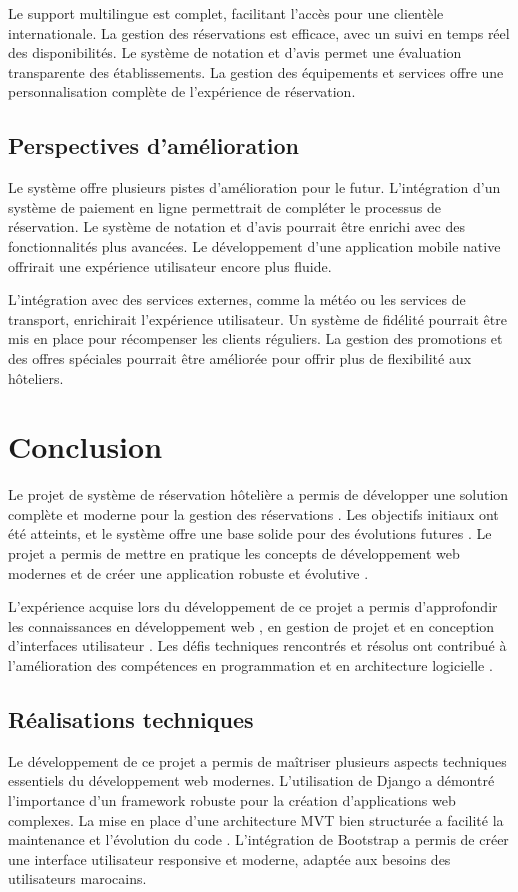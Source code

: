 \documentclass[12pt,a4paper]{report}
\begin{document}
Le support multilingue est complet, facilitant l'accès pour une clientèle internationale. La gestion des réservations est efficace, avec un suivi en temps réel des disponibilités. Le système de notation et d'avis permet une évaluation transparente des établissements. La gestion des équipements et services offre une personnalisation complète de l'expérience de réservation.

\section{Perspectives d'amélioration}
Le système offre plusieurs pistes d'amélioration pour le futur. L'intégration d'un système de paiement en ligne permettrait de compléter le processus de réservation. Le système de notation et d'avis pourrait être enrichi avec des fonctionnalités plus avancées. Le développement d'une application mobile native offrirait une expérience utilisateur encore plus fluide.

L'intégration avec des services externes, comme la météo ou les services de transport, enrichirait l'expérience utilisateur. Un système de fidélité pourrait être mis en place pour récompenser les clients réguliers. La gestion des promotions et des offres spéciales pourrait être améliorée pour offrir plus de flexibilité aux hôteliers.

\chapter{Conclusion}
Le projet de système de réservation hôtelière a permis de développer une solution complète et moderne pour la gestion des réservations \cite{django-pro}. Les objectifs initiaux ont été atteints, et le système offre une base solide pour des évolutions futures \cite{clean-code}. Le projet a permis de mettre en pratique les concepts de développement web modernes et de créer une application robuste et évolutive \cite{design-patterns}.

L'expérience acquise lors du développement de ce projet a permis d'approfondir les connaissances en développement web \cite{python-web}, en gestion de projet et en conception d'interfaces utilisateur \cite{material-design}. Les défis techniques rencontrés et résolus ont contribué à l'amélioration des compétences en programmation et en architecture logicielle \cite{rest-best}.

\section{Réalisations techniques}
Le développement de ce projet a permis de maîtriser plusieurs aspects techniques essentiels du développement web modernes. L'utilisation de Django \cite{django-docs} a démontré l'importance d'un framework robuste pour la création d'applications web complexes. La mise en place d'une architecture MVT bien structurée a facilité la maintenance et l'évolution du code \cite{design-patterns}. L'intégration de Bootstrap \cite{bootstrap} a permis de créer une interface utilisateur responsive et moderne, adaptée aux besoins des utilisateurs marocains.
\end{document}
